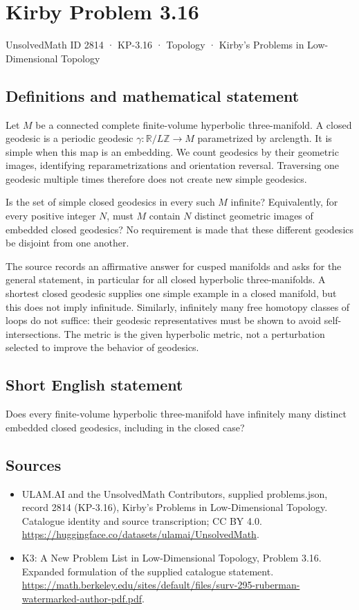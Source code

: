 \documentclass[11pt,a4paper]{article}
\begin{document}
\section*{Kirby Problem 3.16}\label{2814}
{\small UnsolvedMath ID 2814 · KP-3.16 · Topology · Kirby's Problems in Low-Dimensional Topology}
\subsection{Definitions and mathematical statement}
Let $M$ be a connected complete finite-volume hyperbolic three-manifold.
A closed geodesic is a periodic geodesic $\gamma:\mathbb R/L\mathbb Z\to M$
parametrized by arclength. It is simple when this map is an embedding.
We count geodesics by their geometric images, identifying reparametrizations
and orientation reversal. Traversing one geodesic multiple times therefore
does not create new simple geodesics.

Is the set of simple closed geodesics in every such $M$ infinite? Equivalently,
for every positive integer $N$, must $M$ contain $N$ distinct geometric
images of embedded closed geodesics? No requirement is made that these
different geodesics be disjoint from one another.

The source records an affirmative answer for cusped manifolds and asks for
the general statement, in particular for all closed hyperbolic three-manifolds.
A shortest closed geodesic supplies one simple example in a closed manifold,
but this does not imply infinitude. Similarly, infinitely many free homotopy
classes of loops do not suffice: their geodesic representatives must be
shown to avoid self-intersections. The metric is the given hyperbolic metric,
not a perturbation selected to improve the behavior of geodesics.
\subsection{Short English statement}
Does every finite-volume hyperbolic three-manifold have infinitely many distinct embedded closed geodesics, including in the closed case?
\subsection{Sources}
\begin{itemize}
\item[S1] ULAM.AI and the UnsolvedMath Contributors, supplied problems.json, record 2814 (KP-3.16), Kirby's Problems in Low-Dimensional Topology. Catalogue identity and source transcription; CC BY 4.0.
\url{https://huggingface.co/datasets/ulamai/UnsolvedMath}.
\item[S2] K3: A New Problem List in Low-Dimensional Topology, Problem 3.16. Expanded formulation of the supplied catalogue statement.
\url{https://math.berkeley.edu/sites/default/files/surv-295-ruberman-watermarked-author-pdf.pdf}.
\end{itemize}
\end{document}
